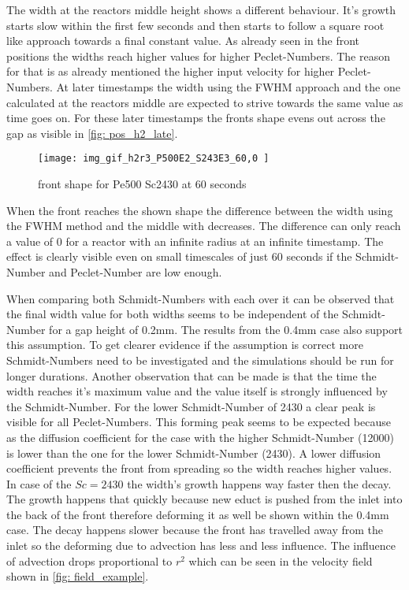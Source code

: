 \documentclass[../thesis.tex]{subfiles}
\begin{document}
The width at the reactors middle height shows a different behaviour. It's growth starts slow within the first few seconds and then starts to follow a square root like approach towards a final constant value. As already seen in the front positions the widths reach higher values for higher Peclet-Numbers. The reason for that is as already mentioned the higher input velocity for higher Peclet-Numbers. At later timestamps the width using the FWHM approach and the one calculated at the reactors middle are expected to strive towards the same value as time goes on. For these later timestamps the fronts shape evens out across the gap as visible in \autoref{fig: pos_h2_late}.
\begin{figure}[htb]
	\centering
	\texttt{[image: img\_gif\_h2r3\_P500E2\_S243E3\_60,0 ]}
	\caption{front shape for Pe500 Sc2430 at 60 seconds}
	\label{fig: pos_h2_late}
\end{figure}
When the front reaches the shown shape the difference between the width using the FWHM method and the middle with decreases. The difference can only reach a value of 0 for a reactor with an infinite radius at an infinite timestamp. The effect is clearly visible even on small timescales of just 60 seconds if the Schmidt-Number and Peclet-Number are low enough.

When comparing both Schmidt-Numbers with each over it can be observed that the final width value for both widths seems to be independent of the Schmidt-Number for a gap height of 0.2mm. The results from the 0.4mm case also support this assumption. To get clearer evidence if the assumption is correct more Schmidt-Numbers need to be investigated and the simulations should be run for longer durations.
Another observation that can be made is that the time the width reaches it's maximum value and the value itself is strongly influenced by the Schmidt-Number. For the lower Schmidt-Number of 2430 a clear peak is visible for all Peclet-Numbers. This forming peak seems to be expected because as the diffusion coefficient for the case with the higher Schmidt-Number (12000) is lower than the one for the lower Schmidt-Number (2430). A lower diffusion coefficient prevents the front from spreading so the width reaches higher values. In case of the $Sc = 2430$ the width's growth happens way faster then the decay. The growth happens that quickly because new educt is pushed from the inlet into the back of the front therefore deforming it as well be shown within the 0.4mm case. The decay happens slower because the front has travelled away from the inlet so the deforming due to advection has less and less influence. The influence of advection drops proportional to $r^2$ which can be seen in the velocity field shown in \autoref{fig: field_example}. 
\newline
\end{document}
